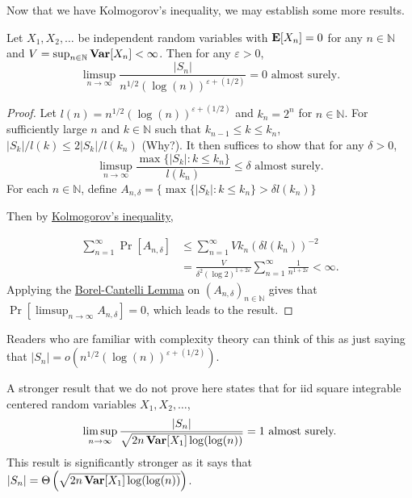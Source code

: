 Now that we have Kolmogorov's inequality, we may establish some more results.

\begin{theorem}
    Let $X_1,X_2,\ldots$ be independent random variables with $\textbf{E}[X_n]=0$ for any $n\in\mathbb{N}$ and $V=\sup_{n\in\mathbb{N}}\operatorname{\textbf{Var}}[X_n]<\infty$. Then for any $\varepsilon>0$,
    $$\limsup_{n\to\infty} \frac{|S_n|}{n^{1/2}(\log(n))^{\varepsilon+(1/2)}}=0\text{ almost surely.}$$
\end{theorem}
\begin{proof}
    Let $l(n)=n^{1/2}(\log(n))^{\varepsilon+(1/2)}$ and $k_n=2^n$ for $n\in\mathbb{N}$. For sufficiently large $n$ and $k\in\mathbb{N}$ such that $k_{n-1}\leq k\leq k_n$, $|S_k|/l(k)\leq 2|S_k|/l(k_n)$  (Why?). It then suffices to show that for any $\delta>0$,
    $$\limsup_{n\to\infty} \frac{\max\{|S_k|:k\leq k_n\}}{l(k_n)} \leq \delta\text{ almost surely.}$$
    For each $n\in\mathbb{N}$, define $A_{n,\delta}=\{\max\{|S_k|:k\leq k_n\} > \delta l(k_n)\}$
    
    Then by \hyperref[kolmogorov's inequality]{Kolmogorov's inequality},
    
    \begin{align*}
        \sum_{n=1}^\infty \Pr[A_{n,\delta}] &\leq \sum_{n=1}^\infty Vk_n(\delta l(k_n))^{-2} \\
        &= \frac{V}{\delta^2(\log 2)^{1+2\varepsilon}}\sum_{n=1}^\infty \frac{1}{n^{1+2\varepsilon}} < \infty.
    \end{align*}
    Applying the \hyperref[borelCantelliLemma]{Borel-Cantelli Lemma} on $(A_{n,\delta})_{n\in\mathbb{N}}$ gives that $\Pr\left[\limsup_{n\to\infty}A_{n,\delta}\right]=0$, which leads to the result. 
\end{proof}

Readers who are familiar with complexity theory can think of this as just saying that $|S_n|=o\left(n^{1/2}(\log (n))^{\varepsilon+(1/2)}\right)$.

\vspace{2mm}

A stronger result that we do not prove here states that for iid square integrable centered random variables $X_1,X_2,\ldots$,
$$\limsup_{n\to\infty} \frac{|S_n|}{\sqrt{2n\operatorname{\textbf{Var}}[X_1]\log(\log(n))}}=1\text{ almost surely.}$$
This result is significantly stronger as it says that $|S_n|=\Theta\left(\sqrt{2n\operatorname{\textbf{Var}}[X_1]\log(\log(n))}\right)$.



\clearpage